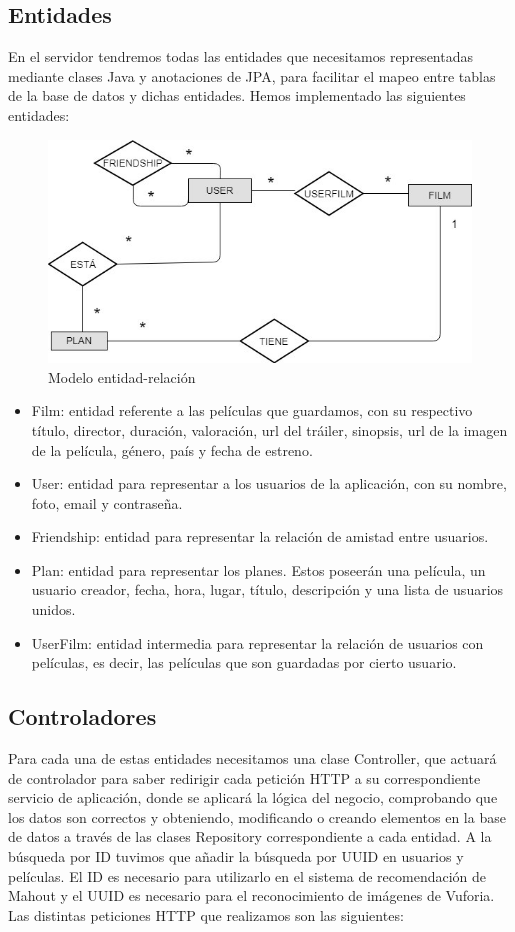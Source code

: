 \subsection{Entidades}
\label{makereference4.3.1}
En el servidor tendremos todas las entidades que necesitamos representadas mediante clases Java y anotaciones de JPA, para facilitar el mapeo entre tablas de la base de datos y dichas entidades. Hemos implementado las siguientes entidades:
\begin{figure}[H]
    \centering
    \includegraphics[width=6in]{figures/chapter-4/Entidades-ER.jpeg}
    \caption{Modelo entidad-relación}
    \label{fig:arquitectura}
\end{figure}
\begin{itemize}
    \item Film: entidad referente a las películas que guardamos, con su respectivo título, director, duración, valoración, url del tráiler, sinopsis, url de la imagen de la película, género, país y fecha de estreno.
    \item User: entidad para representar a los usuarios de la aplicación, con su nombre, foto, email y contraseña.
    \item Friendship: entidad para representar la relación de amistad entre usuarios.
    \item Plan: entidad para representar los planes. Estos poseerán una película, un usuario creador, fecha, hora, lugar, título, descripción y una lista de usuarios unidos.
    \item UserFilm: entidad intermedia para representar la relación de usuarios con películas, es decir, las películas que son guardadas por cierto usuario.
\end{itemize}
\subsection{Controladores}
\label{makereference4.3.2}
Para cada una de estas entidades necesitamos una clase Controller, que actuará de controlador para saber redirigir cada petición HTTP a su correspondiente servicio de aplicación, donde se aplicará la lógica del negocio, comprobando 
que los datos son correctos y obteniendo, modificando o creando elementos en la base de datos a través de las clases Repository correspondiente a cada entidad.
A la búsqueda por ID tuvimos que añadir la búsqueda por UUID en usuarios y películas.
El ID es necesario para utilizarlo en el sistema de recomendación de Mahout y
el UUID es necesario para el reconocimiento de imágenes de Vuforia.
Las distintas peticiones HTTP que realizamos son las siguientes:

